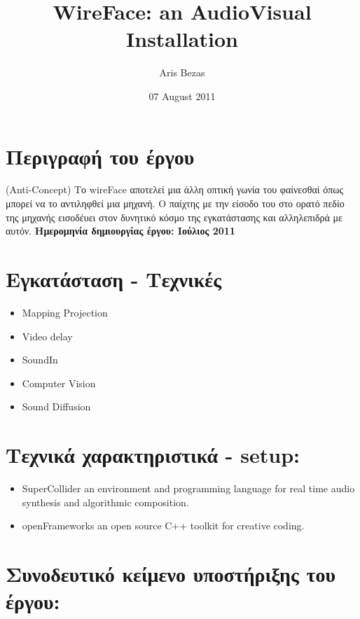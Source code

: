 \documentclass[11pt]{article}
\begin{document}
\title{WireFace: an AudioVisual Installation}
\author{Aris Bezas}
\date{07 August 2011}
\maketitle

\setcounter{tocdepth}{3}
\tableofcontents
\vspace*{1cm}




\section{Περιγραφή του έργου}
\label{sec-1}

(Anti-Concept) 
\newline
Το wireFace αποτελεί μια άλλη οπτική γωνία του φαίνεσθαί όπως μπορεί να το αντιληφθεί μια μηχανή. Ο παίχτης με την είσοδο του στο ορατό πεδίο της μηχανής εισοδέυει στον δυνητικό κόσμο της εγκατάστασης και αλληλεπιδρά με αυτόν. 
\newline
\textbf{Ημερομηνία δημιουργίας έργου:  Ιούλιος 2011}
\section{Εγκατάσταση - Τεχνικές}
\label{sec-2}

\begin{itemize}
\item Mapping Projection
\item Video delay
\item SoundIn
\item Computer Vision
\item Sound Diffusion
\end{itemize}
\section{Τεχνικά χαρακτηριστικά - setup:}
\label{sec-3}

\begin{itemize}
\item SuperCollider an environment and programming language for real time audio synthesis and algorithmic composition.
\item openFrameworks an open source C++ toolkit for creative coding.
\end{itemize}
\section{Συνοδευτικό κείμενο υποστήριξης του έργου:}
\label{sec-4}
\end{document}
